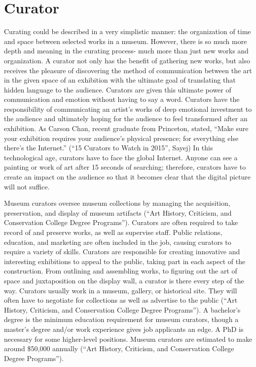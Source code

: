 \chapter{Curator}
\begin{multicols}{2}

Curating could be described in a very simplistic manner: the organization of time and space between selected works in a museum. However, there is so much more depth and meaning in the curating process- much more than just new works and organization. A curator not only has the benefit of gathering new works, but also receives the pleasure of discovering the method of communication between the art in the given space of an exhibition with the ultimate goal of translating that hidden language to the audience. Curators are given this ultimate power of communication and emotion without having to say a word. Curators have the responsibility of communicating an artist’s works of deep emotional investment to the audience and ultimately hoping for the audience to feel transformed after an exhibition. As Carson Chan, recent graduate from Princeton, stated, “Make sure your exhibition requires your audience’s physical presence; for everything else there’s the Internet.” (“15 Curators to Watch in 2015”, Sayej) In this technological age, curators have to face the global Internet. Anyone can see a painting or work of art after 15 seconds of searching; therefore, curators have to create an impact on the audience so that it becomes clear that the digital picture will not suffice. 

Museum curators oversee museum collections by managing the acquisition, preservation, and display of museum artifacts (“Art History, Criticism, and Conservation College Degree Programs”). Curators are often required to take record of and preserve works, as well as supervise staff. Public relations, education, and marketing are often included in the job, causing curators to require a variety of skills. Curators are responsible for creating innovative and interesting exhibitions to appeal to the public, taking part in each aspect of the construction. From outlining and assembling works, to figuring out the art of space and juxtaposition on the display wall, a curator is there every step of the way. Curators usually work in a museum, gallery, or historical site. They will often have to negotiate for collections as well as advertise to the public (“Art History, Criticism, and Conservation College Degree Programs”). A bachelor's degree is the minimum education requirement for museum curators, though a master's degree and/or work experience gives job applicants an edge. A PhD is necessary for some higher-level positions. Museum curators are estimated to make around \$50,000 annually (“Art History, Criticism, and Conservation College Degree Programs”).

\end{multicols}

